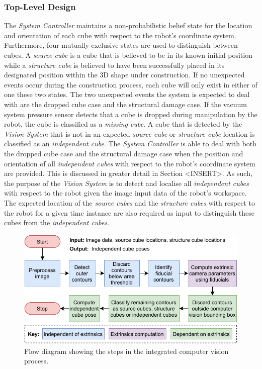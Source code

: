 
\subsubsection{Top-Level Design} \label{sec:Top-Level Design}

The \textit{System Controller} maintains a non-probabilistic belief state for the location and orientation of each cube with respect to the robot's coordinate system. Furthermore, four mutually exclusive states are used to distinguish between cubes. A \textit{source cube} is a cube that is believed to be in its known initial position while a \textit{structure cube} is believed to have been successfully placed in its designated position within the 3D shape under construction. If no unexpected events occur during the construction process, each cube will only exist in either of one these two states. The two unexpected events the system is expected to deal with are the dropped cube case and the structural damage case. If the vacuum system pressure sensor detects that a cube is dropped during manipulation by the robot, the cube is classified as a \textit{missing cube}. A cube that is detected by the \textit{Vision System} that is not in an expected \textit{source cube} or \textit{structure cube} location is classified as an \textit{independent cube}. The \textit{System Controller} is able to deal with both the dropped cube case and the structural damage case when the position and orientation of all \textit{independent cubes} with respect to the robot's coordinate system are provided. This is discussed in greater detail in Section <INSERT>. As such, the purpose of the \textit{Vision System} is to detect and localise all \textit{independent cubes} with respect to the robot given the image input data of the robot's workspace. The expected location of the \textit{source cubes} and the \textit{structure cubes} with respect to the robot for a given time instance are also required as input to distinguish these cubes from the \textit{independent cubes}.


\begin{figure}[!ht]
	\centering
	\includegraphics[scale=1]{figures/high-level-computer-vision-design.pdf}
	\caption{Flow diagram showing the steps in the integrated computer vision process.}
	\label{fig:high-level-computer-vision-design}
\end{figure}

